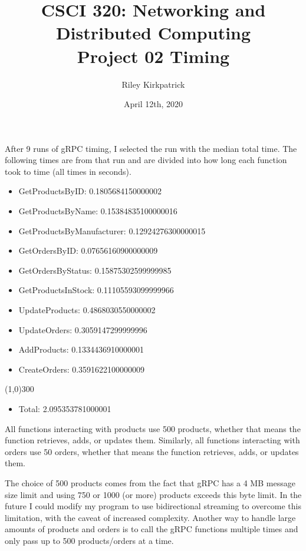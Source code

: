 \documentclass[12pt]{article}
\begin{document}
 \title{CSCI 320: Networking and Distributed Computing \\ Project 02 Timing}
 \author{Riley Kirkpatrick}
 \date{April 12th, 2020}
 
 \maketitle

After 9 runs of gRPC timing, I selected the run with the median total time.
The following times are from that run and are divided into how long each function took to time (all times in seconds).
\begin{itemize}
\item[] GetProductsByID: 0.1805684150000002
\item[] GetProductsByName: 0.15384835100000016
\item[] GetProductsByManufacturer: 0.12924276300000015
\item[] GetOrdersByID: 0.07656160900000009
\item[] GetOrdersByStatus: 0.15875302599999985
\item[] GetProductsInStock: 0.11105593099999966
\item[] UpdateProducts: 0.4868030550000002
\item[] UpdateOrders: 0.3059147299999996
\item[] AddProducts: 0.1334436910000001
\item[] CreateOrders: 0.3591622100000009
\end{itemize}

\vspace{-1em}
\line(1,0){300}
\vspace{-0.6em}

\begin{itemize}
\item[] Total: 2.095353781000001
\end{itemize}


\noindent All functions interacting with products use 500 products, whether that means the function retrieves, adds, or updates them.
Similarly, all functions interacting with orders use 50 orders, whether that means the function retrieves, adds, or updates them.


The choice of 500 products comes from the fact that gRPC has a 4 MB message size limit and using 750 or 1000 (or more) products exceeds this byte limit.
In the future I could modify my program to use bidirectional streaming to overcome this limitation, with the caveat of increased complexity.
Another way to handle large amounts of products and orders is to call the gRPC functions multiple times and only pass up to 500 products/orders at a time.
\end{document}
